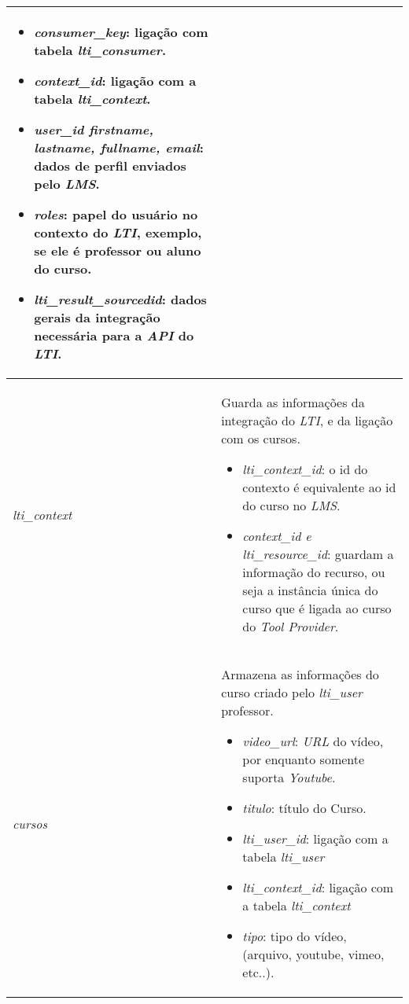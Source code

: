 \begin{anexosenv}
\begin{longtable}{|p{}|p{}|}
        \begin{itemize}
            \item \textit{consumer\_key}: ligação com tabela \textit{lti\_consumer}.
            \item \textit{context\_id}: ligação com a tabela \textit{lti\_context}.
            \item \textit{user\_id firstname, lastname, fullname, email}: dados de perfil enviados pelo \textit{LMS}.
            \item \textit{roles}: papel do usuário no contexto do \textit{LTI}, exemplo, se ele é professor ou aluno do curso.
            \item \textit{lti\_result\_sourcedid}: dados gerais da integração necessária para a \textit{API} do \textit{LTI}.
        \end{itemize}
        \\
        \hline \textit{lti\_context} &
        Guarda as informações da integração do \textit{LTI}, e da ligação com os cursos.
        
        \begin{itemize}
            \item \textit{lti\_context\_id}: o id do contexto é equivalente ao id do curso no \textit{LMS}.
            \item \textit{context\_id e lti\_resource\_id}: guardam a informação do recurso, ou seja a instância única do curso que é ligada ao curso do \textit{Tool Provider}.
        \end{itemize}
        \\
        \hline \textit{cursos} &
        Armazena as informações do curso criado pelo \textit{lti\_user} professor.
        
        \begin{itemize}
            \item \textit{video\_url}: \textit{URL} do vídeo, por enquanto somente suporta \textit{Youtube}.
            \item \textit{titulo}: título do Curso.
            \item \textit{lti\_user\_id}: ligação com a tabela \textit{lti\_user}
            \item \textit{lti\_context\_id}: ligação com a tabela \textit{lti\_context}
            \item \textit{tipo}: tipo do vídeo, (arquivo, youtube, vimeo, etc..).
        \end{itemize}
        \\
        

\end{longtable}
\end{anexosenv}

